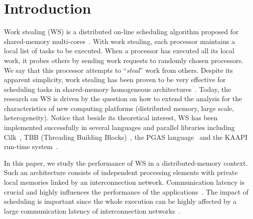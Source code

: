 \section{Introduction}
\label{sec:intro}

Work stealing (WS) is a distributed on-line scheduling algorithm
proposed for shared-memory multi-cores~\cite{Arora2001}. With work
stealing, each processor maintains a local list of tasks to be
executed. When a processor has executed all its local work, it probes
others by sending work requests to randomly chosen processors. We say
that this processor attempts to ``\emph{steal}'' work from others.
Despite its apparent simplicity, work stealing has been proven to be
very effective for scheduling tasks in shared-memory homogeneous
architectures~\cite{Blumofe1999}. Today, the research on WS is driven
by the question on how to extend the analysis for the characteristics
of new computing platforms (distributed memory, large scale,
heterogeneity).  Notice that beside its theoretical interest, WS has
been implemented successfully in several languages and parallel
libraries including Cilk~\cite{Leiserson1998,Leiserson2009}, TBB
(Threading Building Blocks)~\cite{Robison2008}, the PGAS
language~\cite{Dinan2009,Seung-Jai2011} and the KAAPI run-time
system~\cite{Kaapi2007}.


In this paper, we study the performance of WS in a distributed-memory
context.
Such an architecture consists of independent processing elements with
private local memories linked by an interconnection
network. Communication latency is crucial and highly influences the
performance of the applications~\cite{MCMCA}. 
The impact of scheduling is important since the whole execution can be
highly affected by a large communication latency of interconnection
networks~\cite{MultiCoreClusterArchitectur2015}.







